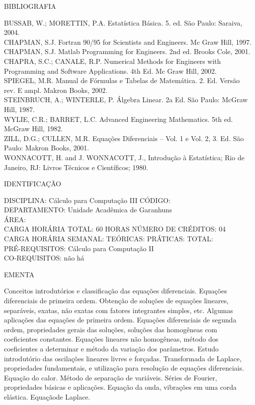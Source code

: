 \documentclass[
	12pt,				%
	openright,			%
  oneside,     %
	a4paper,			%
	english,			%
	french,				%
	spanish,			%
	brazil				%
	]{abntex2}
\begin{document}
\begin{apendicesenv}
BIBLIOGRAFIA 

BUSSAB, W.; MORETTIN, P.A. Estatística Básica. 5. ed. São Paulo:
Saraiva, 2004.\\
CHAPMAN, S.J. Fortran 90/95 for Scientists and Engineers. Mc Graw Hill,
1997.\\
CHAPMAN, S.J. Matlab Programming for Engineers. 2nd ed. Brooks Cole,
2001.\\
CHAPRA, S.C.; CANALE, R.P. Numerical Methods for Engineers with
Programming and Software Applications. 4th Ed. Mc Graw Hill, 2002.\\
SPIEGEL, M.R. Manual de Fórmulas e Tabelas de Matemática. 2. Ed. Versão
rev. E ampl. Makron Books, 2002.\\
STEINBRUCH, A.; WINTERLE, P. Álgebra Linear. 2a Ed. São Paulo: McGraw
Hill, 1987.\\
WYLIE, C.R.; BARRET, L.C. Advanced Engineering Mathematics. 5th ed.
McGraw Hill, 1982.\\
ZILL, D.G.; CULLEN, M.R. Equações Diferenciais -- Vol. 1 e Vol. 2, 3.
Ed. São Paulo: Makron Books, 2001.\\
WONNACOTT, H. and J. WONNACOTT, J., Introdução à Estatística; Rio de
Janeiro, RJ: Livros Técnicos e Científicos; 1980.

\newpage IDENTIFICAÇÃO

DISCIPLINA: Cálculo para Computação III CÓDIGO:\\ 
DEPARTAMENTO: Unidade Acadêmica de Garanhuns\\
ÁREA: \\
CARGA HORÁRIA TOTAL: 60 HORAS NÚMERO DE CRÉDITOS: 04\\
CARGA HORÁRIA SEMANAL: TEÓRICAS: PRÁTICAS: TOTAL: \\
PRÉ-REQUISITOS: Cálculo para Computação II\\
CO-REQUISITOS: não há

EMENTA 

Conceitos introdutórios e classificação das equações diferenciais. Equações diferenciais de primeira ordem. Obtenção de soluções de equações lineares, separáveis, exatas, não exatas com fatores integrantes simples, etc. Algumas aplicações das equações de primeira ordem. Equações diferenciais de segunda ordem, propriedades gerais das soluções, soluções das homogêneas com coeficientes constantes. Equações lineares não homogêneas, método dos coeficientes a determinar e método da variação dos parâmetros. Estudo introdutório das oscilações lineares livres e forçadas. Transformada de Laplace, propriedades fundamentais, e utilização para resolução de equações diferenciais. Equação do calor. Método de separação de variáveis. Séries de Fourier, propriedades básicas e aplicações. Equação da onda, vibrações em uma corda elástica. Equaçãode Laplace.


\end{apendicesenv}
\end{document}
